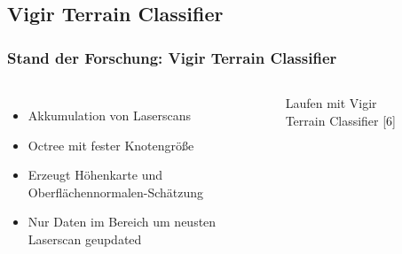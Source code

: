 \subsection*{Vigir Terrain Classifier}

\begin{frame}[t]
  \frametitle{Stand der Forschung: Vigir Terrain Classifier}
      
     \begin{columns}[t]
      \column[]{6cm}
     
      \begin{itemize}
	\item Akkumulation von Laserscans
	\item Octree mit fester Knotengröße
	\item Erzeugt Höhenkarte und Oberflächennormalen-Schätzung
	\item Nur Daten im Bereich um neusten Laserscan geupdated
      \end{itemize} 
     
     \column{6cm}
     

       \begin{figure}[h]
       \vspace{-0.5cm}
 	\caption{Laufen mit Vigir Terrain Classifier [6]} 
       \end{figure}

  
    \end{columns}  
      
\end{frame}


